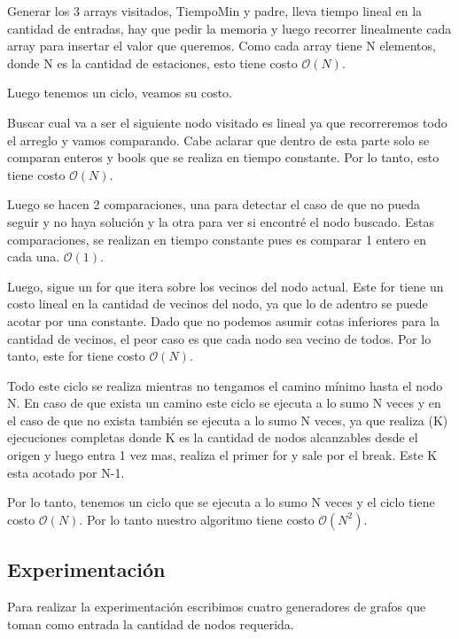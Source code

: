 Generar los 3 arrays visitados, TiempoMin y padre, lleva tiempo lineal en la cantidad de entradas, hay que pedir la memoria y luego recorrer linealmente cada array para insertar el valor que queremos. Como cada array tiene N elementos, donde N es la cantidad de estaciones, esto tiene costo $\mathcal{O}(N)$.

Luego tenemos un ciclo,  veamos su costo.

Buscar cual va a ser el siguiente nodo visitado es lineal ya que  recorreremos  todo el arreglo y vamos  comparando. Cabe aclarar que dentro de esta parte solo se comparan enteros y bools que se realiza en tiempo constante. Por lo tanto, esto tiene costo $\mathcal{O}(N)$.

Luego se hacen 2 comparaciones, una para detectar el caso de que no pueda seguir y no haya solución y la otra para ver si encontré el nodo buscado. Estas comparaciones, se realizan en tiempo constante pues es comparar 1 entero en cada una. $\mathcal{O}(1)$.

Luego, sigue un for que itera sobre los vecinos del nodo actual. Este for tiene un costo lineal en la cantidad de vecinos del nodo, ya que lo de adentro se puede acotar por una constante. Dado que no podemos asumir cotas inferiores para la cantidad de vecinos, el peor caso es que cada nodo sea vecino de todos. Por lo tanto, este for tiene costo $\mathcal{O}(N)$.

Todo este ciclo se realiza mientras no tengamos el camino mínimo hasta el nodo N.  En caso de que exista un camino este ciclo se ejecuta a lo sumo N veces y en el caso de que no exista también se ejecuta a lo sumo N veces, ya que realiza (K) ejecuciones completas donde K es la cantidad de nodos alcanzables desde el origen y luego entra 1 vez mas, realiza el primer for y sale por el break. Este K esta acotado por N-1.

Por lo tanto, tenemos un ciclo que se ejecuta a lo sumo N veces y el ciclo tiene costo $\mathcal{O}(N)$. Por lo tanto nuestro algoritmo tiene costo $\mathcal{O}(N^{2})$.

\subsection{Experimentación}

Para realizar la experimentación escribimos cuatro generadores de grafos que toman como entrada la cantidad de nodos requerida.

